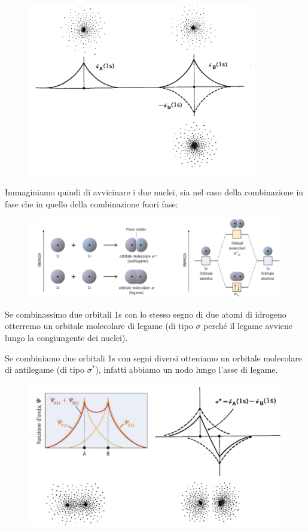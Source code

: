 \begin{figure}[H]
    \centering
    \includegraphics[width=10cm]{immagini/orbitali_atomici.png}
\end{figure}

Immaginiamo quindi di avvicinare i due nuclei, sia nel caso della combinazione in fase che in quello della combinazione fuori fase:

\begin{figure}[H]
    \centering
    \includegraphics[width=16cm]{immagini/orbitali_molecolari_H_2.png}
\end{figure}

Se combinassimo due orbitali 1s con lo stesso segno di due atomi di idrogeno otterremo un orbitale molecolare di legame (di tipo $\sigma$ perché il legame avviene lungo la congiungente dei nuclei).

Se combiniamo due orbitali 1s con segni diversi otteniamo un orbitale molecolare di antilegame (di tipo $\sigma^*$), infatti abbiamo un nodo lungo l'asse di legame.

\begin{figure}[htp]
    \centering
    \includegraphics[width=12cm]{immagini/combinazione_funzioni.png}
\end{figure}


